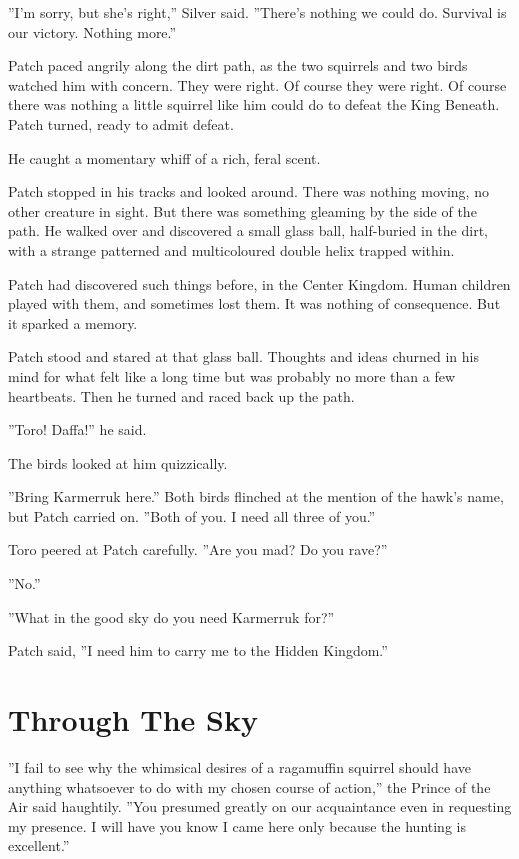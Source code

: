 \documentclass[12pt]{book}
\begin{document}
''I'm sorry, but she's right,'' Silver said. ''There's nothing we could do. Survival is our victory. Nothing more.''

Patch paced angrily along the dirt path, as the two squirrels and two birds watched him with concern. They were right. Of course they were right. Of course there was nothing a little squirrel like him could do to defeat the King Beneath. Patch turned, ready to admit defeat.

He caught a momentary whiff of a rich, feral scent.

Patch stopped in his tracks and looked around. There was nothing moving, no other creature in sight. But there was something gleaming by the side of the path. He walked over and discovered a small glass ball, half-buried in the dirt, with a strange patterned and multicoloured double helix trapped within.

Patch had discovered such things before, in the Center Kingdom. Human children played with them, and sometimes lost them. It was nothing of consequence. But it sparked a memory.

Patch stood and stared at that glass ball. Thoughts and ideas churned in his mind for what felt like a long time but was probably no more than a few heartbeats. Then he turned and raced back up the path.

''Toro! Daffa!'' he said.

The birds looked at him quizzically.

''Bring Karmerruk here.'' Both birds flinched at the mention of the hawk's name, but Patch carried on. ''Both of you. I need all three of you.''

Toro peered at Patch carefully. ''Are you mad? Do you rave?''

''No.''

''What in the good sky do you need Karmerruk for?''

Patch said, ''I need him to carry me to the Hidden Kingdom.''


\section{Through The Sky}

''I fail to see why the whimsical desires of a ragamuffin squirrel should have anything whatsoever to do with my chosen course of action,'' the Prince of the Air said haughtily. ''You presumed greatly on our acquaintance even in requesting my presence. I will have you know I came here only because the hunting is excellent.''
\end{document}
